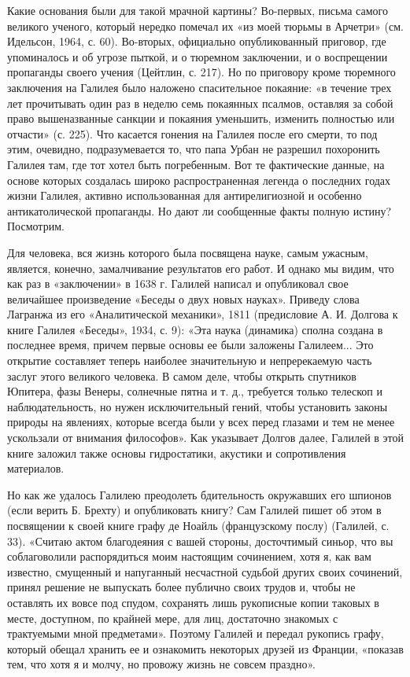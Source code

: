 Какие основания были для такой мрачной картины? Во-первых, письма самого
великого ученого, который нередко помечал их «из моей тюрьмы в Арчетри» (см.
Идельсон, 1964, с. 60). Во-вторых, официально опубликованный приговор, где
упоминалось и об угрозе пыткой, и о тюремном заключении, и о воспрещении
пропаганды своего учения (Цейтлин, с. 217). Но по приговору кроме тюремного
заключения на Галилея было наложено спасительное покаяние: «в течение трех лет
прочитывать один раз в неделю семь покаянных псалмов, оставляя за собой право
вышеназванные санкции и покаяния уменьшить, изменить полностью или отчасти» (с.
225). Что касается гонения на Галилея после его смерти, то под этим, очевидно,
подразумевается то, что папа Урбан не разрешил похоронить Галилея там, где тот
хотел быть погребенным. Вот те фактические данные, на основе которых создалась
широко распространенная легенда о последних годах жизни Галилея, активно
использованная для антирелигиозной и особенно антикатолической пропаганды. Но
дают ли сообщенные факты полную истину? Посмотрим.

Для человека, вся жизнь которого была посвящена науке, самым ужасным, является,
конечно, замалчивание результатов его работ. И однако мы видим, что как раз в
«заключении» в 1638 г. Галилей написал и опубликовал свое величайшее
произведение «Беседы о двух новых науках». Приведу слова Лагранжа из его
«Аналитической механики», 1811 (предисловие А. И. Долгова к книге Галилея
«Беседы», 1934, с. 9): «Эта наука (динамика) сполна создана в последнее время,
причем первые основы ее были заложены Галилеем... Это открытие составляет
теперь наиболее значительную и непререкаемую часть заслуг этого великого
человека. В самом деле, чтобы открыть спутников Юпитера, фазы Венеры, солнечные
пятна и т. д., требуется только телескоп и наблюдательность, но нужен
исключительный гений, чтобы установить законы природы на явлениях, которые
всегда были у всех перед глазами и тем не менее ускользали от внимания
философов». Как указывает Долгов далее, Галилей в этой книге заложил также
основы гидростатики, акустики и сопротивления материалов.

Но как же удалось Галилею преодолеть бдительность окружавших его шпионов (если
верить Б. Брехту) и опубликовать книгу? Сам Галилей пишет об этом в посвящении
к своей книге графу де Ноайль (французскому послу) (Галилей, с. 33). «Считаю
актом благодеяния с вашей стороны, досточтимый синьор, что вы соблаговолили
распорядиться моим настоящим сочинением, хотя я, как вам известно, смущенный и
напуганный несчастной судьбой других своих сочинений, принял решение не
выпускать более публично своих трудов и, чтобы не оставлять их вовсе под
спудом, сохранять лишь рукописные копии таковых в месте, доступном, по крайней
мере, для лиц, достаточно знакомых с трактуемыми мной предметами». Поэтому
Галилей и передал рукопись графу, который обещал хранить ее и ознакомить
некоторых друзей из Франции, «показав тем, что хотя я и молчу, но провожу жизнь
не совсем праздно».

